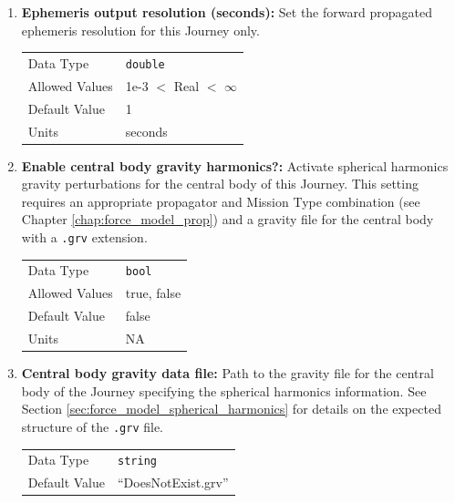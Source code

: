\begin{enumerate}
        \item \textbf{Ephemeris output resolution (seconds):} Set the forward propagated ephemeris resolution for this Journey only.

            \begin{table}[H]
                \hspace{2cm}
                \begin{tabular}{ll}
                Data Type & \verb|double| \\
                Allowed Values & 1e-3 $<$ Real $<$ $\infty$ \\
                Default Value & 1\\
                Units & seconds
                \end{tabular}
            \end{table}

    \item \textbf{Enable central body gravity harmonics?:} Activate spherical harmonics gravity perturbations for the central body of this Journey. This setting requires an appropriate propagator and Mission Type combination (see Chapter \ref{chap:force_model_prop}) and a gravity file for the central body with a {\tt .grv} extension. 

            \begin{table}[H]
                \hspace{2cm}
                \begin{tabular}{ll}
                Data Type & \verb|bool| \\
                Allowed Values & true, false \\
                Default Value & false \\
                Units & NA
                \end{tabular}
            \end{table}

            \item \textbf{Central body gravity data file:} Path to the gravity file for the central body of the Journey specifying the spherical harmonics information. See Section \ref{sec:force_model_spherical_harmonics} for details on the expected structure of the {\tt .grv} file.

                \begin{table}[H]
                    \hspace{2cm}
                    \begin{tabular}{ll}
                    Data Type & \verb|string| \\
                    Default Value & ``DoesNotExist.grv'' \\
                    \end{tabular}
                \end{table}


\end{enumerate}
